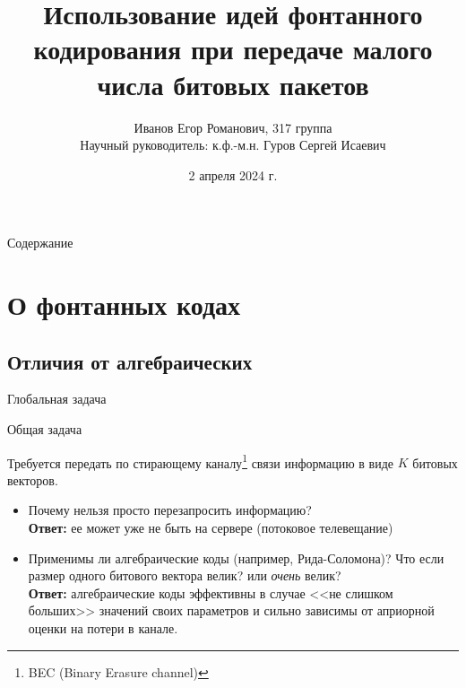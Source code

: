 \documentclass{beamer}
\title[Фонтанные коды]{Использование идей фонтанного кодирования 
при передаче малого числа битовых пакетов}
\author[Иванов Е.Р.]{Иванов Егор Романович, 317 группа \\ 
Научный руководитель: к.ф.-м.н. Гуров Сергей Исаевич}
\date[2 апреля 2024 г.]{2 апреля 2024 г.}
\institute{ММП ВМК МГУ}
\begin{document}
\frame{\titlepage}

\begin{frame}{Содержание}
    \tableofcontents
\end{frame}

\section{О фонтанных кодах}

\subsection{Отличия от алгебраических}

\begin{frame}{Глобальная задача}

    \begin{block}{Общая задача}

        Требуется передать по стирающему каналу\footnote{
        BEC (Binary Erasure channel)} связи 
        информацию в виде $K$ битовых векторов.
        
    \end{block}

    \begin{itemize}
        \item Почему нельзя просто перезапросить информацию? \\
            \textbf{Ответ:} ее может уже не быть на сервере (потоковое телевещание)
        \item Применимы ли алгебраические коды (например, Рида-Соломона)? 
        Что если размер одного битового вектора велик? или \textit{очень} велик? \\
            \textbf{Ответ:} алгебраические коды эффективны в случае <<не слишком 
            больших>> значений своих параметров и сильно зависимы 
            от априорной оценки на потери в канале.
    \end{itemize}

\end{frame}
\end{document}
